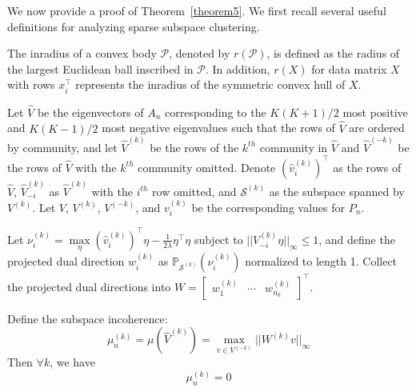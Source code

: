 \documentclass[12pt]{article}
\begin{document}
We now provide a proof of Theorem~\ref{theorem5}. We first recall several
useful definitions for analyzing sparse subspace clustering.

\begin{definition}
The inradius of a convex body $\mathcal{P}$, denoted by $r(\mathcal{P})$, is 
defined as the radius of the largest Euclidean ball inscribed in $\mathcal{P}$.
In addition, $r(X)$ for data matrix $X$ with rows $x_i^\top$ represents 
the inradius of the symmetric convex hull of $X$. 
\end{definition}

\begin{definition}
\end{definition}

\begin{lemma}
\label{lemma2}
Let $\hat{V}$ be the eigenvectors of $A_n$ corresponding to the $K (K + 1) / 2$ most positive and $K (K - 1) / 2$ most negative eigenvalues such that the rows of $\hat{V}$ are ordered by community, and let $\hat{V}^{(k)}$ be the rows of the $k^{th}$ community in $\hat{V}$ and $\hat{V}^{(-k)}$ be the rows of $\hat{V}$ with the $k^{th}$ community omitted. Denote $(\hat{v}_i^{(k)})^\top$ as the rows of $\hat{V}$, $\hat{V}_{-i}^{(k)}$ as $\hat{V}^{(k)}$ with the $i^{th}$ row omitted, and $\mathcal{S}^{(k)}$ as the subspace spanned by $V^{(k)}$. Let $V$, $V^{(k)}$, $V^{(-k)}$, and $v_i^{(k)}$ be the corresponding values for $P_n$. 

Let $\nu_{i}^{(k)} = \max\limits_\eta (\hat{v}_i^{(k)})^\top \eta - \frac{1}{2 \lambda} \eta^\top \eta$ subject to $||V_{-i}^{(k)} \eta||_\infty \leq 1$, and define the projected dual direction $w_{i}^{(k)}$ as $\mathbb{P}_{\mathcal{S}^{(k)}}(\nu_i^{(k)})$ normalized to length 1. Collect the projected dual directions into $W = \begin{bmatrix} w_1^{(k)} & \cdots & w_{n_k}^{(k)} \end{bmatrix}^\top$.

Define the subspace incoherence:
$$\mu_n^{(k)} = \mu(\hat{V}^{(k)}) = \max\limits_{v \in V^{(-k)}} ||W^{(k)} v||_\infty$$
Then $\forall k$, we have
\begin{equation} \label{eq:mu-conv}
\mu_n^{(k)} = 0
\end{equation}
\end{lemma}
\end{document}
